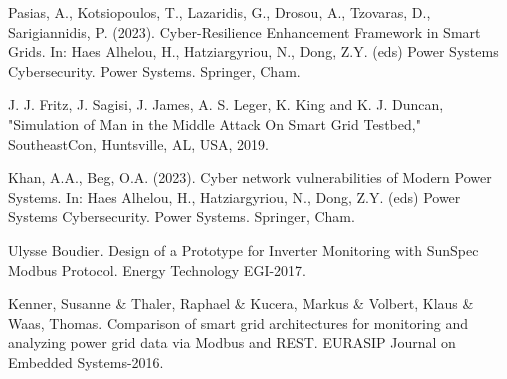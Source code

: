\documentclass[letterpaper,10pt,conference]{IEEEtran}
\begin{document}
\begin{thebibliography}{00}
Pasias, A., Kotsiopoulos, T., Lazaridis, G., Drosou, A., Tzovaras, D., Sarigiannidis, P. (2023). Cyber-Resilience Enhancement Framework in Smart Grids. In: Haes Alhelou, H., Hatziargyriou, N., Dong, Z.Y. (eds) Power Systems Cybersecurity. Power Systems. Springer, Cham. 

J. J. Fritz, J. Sagisi, J. James, A. S. Leger, K. King and K. J. Duncan, "Simulation of Man in the Middle Attack On Smart Grid Testbed," SoutheastCon, Huntsville, AL, USA, 2019.

Khan, A.A., Beg, O.A. (2023). Cyber network vulnerabilities of Modern Power Systems. In: Haes Alhelou, H., Hatziargyriou, N., Dong, Z.Y. (eds) Power Systems Cybersecurity. Power Systems. Springer, Cham. 

Ulysse Boudier. Design of a Prototype for Inverter Monitoring
with SunSpec Modbus Protocol. Energy Technology EGI-2017.

Kenner, Susanne \& Thaler, Raphael \& Kucera, Markus \& Volbert, Klaus \& Waas, Thomas. Comparison of smart grid architectures for monitoring and analyzing power grid data via Modbus and REST. EURASIP Journal on Embedded Systems-2016.


\end{thebibliography}
\end{document}
